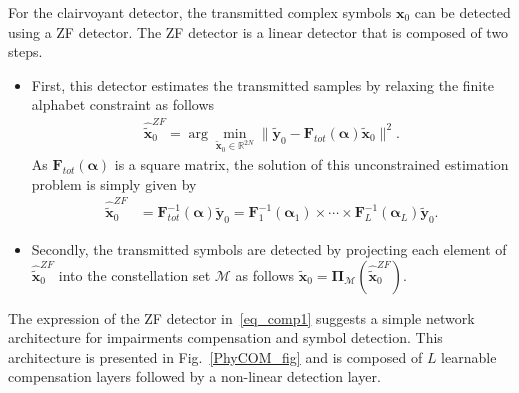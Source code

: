 \documentclass{article}
\begin{document}
For the clairvoyant detector, the transmitted complex symbols $\mathbf{x}_{0}$ can be detected using a ZF detector. The ZF detector is a linear detector that is composed of two steps. 
\begin{itemize}
\item First, this detector estimates the transmitted samples by relaxing the finite alphabet constraint as follows
\begin{align}
\widehat{\tilde{\mathbf{x}}}_{0}^{ZF}=\arg \min_{\tilde{\mathbf{x}}_{0}\in \mathbb{R}^{2N}} \| \tilde{\mathbf{y}}_{0}- \mathbf{F}_{tot}(\boldsymbol \alpha)\tilde{\mathbf{x}}_{0}\|^2.
\end{align}
As $ \mathbf{F}_{tot}(\boldsymbol \alpha)$ is a square matrix, the solution of this unconstrained estimation problem is simply given by
\begin{align}
\widehat{\tilde{\mathbf{x}}}_{0}^{ZF}&=\mathbf{F}^{-1}_{tot}(\boldsymbol \alpha) \tilde{\mathbf{y}}_{0}=\mathbf{F}_{1}^{-1}(\boldsymbol  \alpha_1)\times \cdots \times \mathbf{F}_{L}^{-1}(\boldsymbol  \alpha_L)\tilde{\mathbf{y}}_{0}
\label{eq_comp1}.
\end{align}
\item Secondly, the transmitted symbols are detected by projecting each element of $\widehat{\tilde{\mathbf{x}}}_{0}^{ZF}$ into the constellation set $ \mathcal{M}$ as follows $\widehat{\tilde{\mathbf{x}}}_{0}=\boldsymbol{\Pi}_{\mathcal{M}}(\widehat{\tilde{\mathbf{x}}}_{0}^{ZF})$.
\end{itemize}

The expression of the ZF detector in~\eqref{eq_comp1} suggests a simple network architecture for impairments compensation and symbol detection. This architecture is presented in Fig.~\ref{PhyCOM_fig} and is composed of $L$ learnable compensation layers followed by a non-linear detection layer.

%
\end{document}
